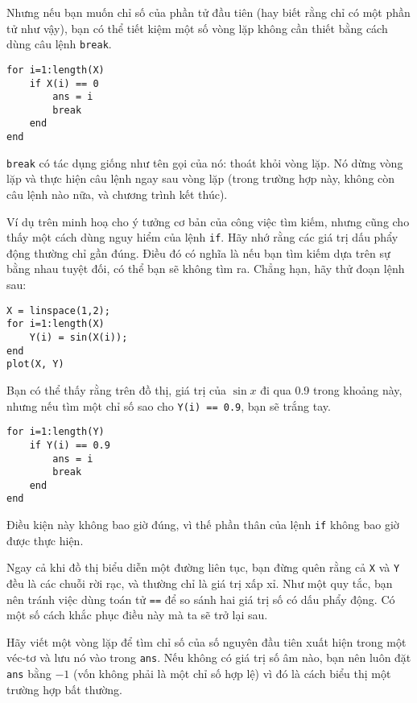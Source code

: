 \documentclass[12pt]{book}
\begin{document}
Nhưng nếu bạn muốn chỉ số của phần tử đầu tiên (hay biết rằng chỉ
có một phần tử như vậy), bạn có thể tiết kiệm một số vòng lặp 
không cần thiết bằng cách dùng câu lệnh {\tt break}.

\begin{verbatim}
for i=1:length(X)
    if X(i) == 0
        ans = i
        break
    end
end
\end{verbatim}

{\tt break} có tác dụng giống như tên gọi của nó: thoát khỏi
vòng lặp. Nó dừng vòng lặp và thực hiện câu lệnh ngay sau 
vòng lặp (trong trường hợp này, không còn câu lệnh nào nữa,
và chương trình kết thúc).

Ví dụ trên minh hoạ cho ý tưởng cơ bản của công việc tìm kiếm,
nhưng cũng cho thấy một cách dùng nguy hiểm của lệnh {\tt if}.
Hãy nhớ rằng các giá trị dấu phẩy động thường chỉ gần đúng. 
Điều đó có nghĩa là nếu bạn tìm kiếm dựa trên sự bằng nhau tuyệt
đối, có thể bạn sẽ không tìm ra. Chẳng hạn, hãy thử đoạn lệnh sau:

\begin{verbatim}
X = linspace(1,2);
for i=1:length(X)
    Y(i) = sin(X(i));
end
plot(X, Y)
\end{verbatim}

Bạn có thể thấy rằng trên đồ thị, giá trị của $\sin x$ đi qua
0.9 trong khoảng này, nhưng nếu tìm một chỉ số sao cho
{\tt Y(i) == 0.9}, bạn sẽ trắng tay.

\begin{verbatim}
for i=1:length(Y)
    if Y(i) == 0.9
        ans = i
        break
    end
end
\end{verbatim}

Điều kiện này không bao giờ đúng, vì thế phần thân của lệnh {\tt if} 
không bao giờ được thực hiện.

Ngay cả khi đồ thị biểu diễn một đường liên tục, bạn đừng quên rằng
cả {\tt X} và {\tt Y} đều là các chuỗi rời rạc, và thường chỉ là 
giá trị xấp xỉ. Như một quy tắc, bạn nên tránh việc dùng toán tử 
{\tt ==} để so sánh hai giá trị số có dấu phẩy động. Có một số cách
khắc phục điều này mà ta sẽ trở lại sau.

\begin{ex}
Hãy viết một vòng lặp để tìm chỉ số của số nguyên đầu tiên xuất hiện
trong một véc-tơ và lưu nó vào trong {\tt ans}.  Nếu không có
giá trị số âm nào, bạn nên luôn đặt {\tt ans} bằng $-1$ (vốn
không phải là một chỉ số hợp lệ) vì đó là cách biểu thị một trường
hợp bất thường.
\end{ex}
\end{document}
